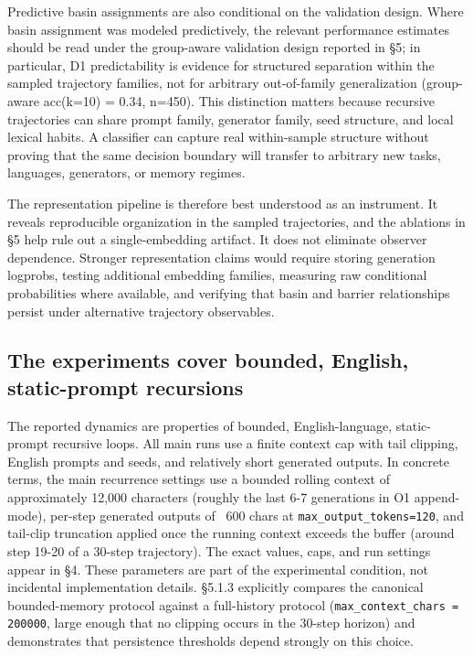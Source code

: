 \documentclass{article}
\theoremstyle{plain}
\theoremstyle{definition}
\begin{document}
Predictive basin assignments are also conditional on the validation design. Where basin assignment was modeled predictively, the relevant performance estimates should be read under the group-aware validation design reported in §5; in particular, D1 predictability is evidence for structured separation within the sampled trajectory families, not for arbitrary out-of-family generalization (group-aware acc(k=10) = 0.34, n=450). This distinction matters because recursive trajectories can share prompt family, generator family, seed structure, and local lexical habits. A classifier can capture real within-sample structure without proving that the same decision boundary will transfer to arbitrary new tasks, languages, generators, or memory regimes.

The representation pipeline is therefore best understood as an instrument. It reveals reproducible organization in the sampled trajectories, and the ablations in §5 help rule out a single-embedding artifact. It does not eliminate observer dependence. Stronger representation claims would require storing generation logprobs, testing additional embedding families, measuring raw conditional probabilities where available, and verifying that basin and barrier relationships persist under alternative trajectory observables.

\subsection{The experiments cover bounded, English, static-prompt recursions}

The reported dynamics are properties of bounded, English-language, static-prompt recursive loops. All main runs use a finite context cap with tail clipping, English prompts and seeds, and relatively short generated outputs. In concrete terms, the main recurrence settings use a bounded rolling context of approximately 12,000 characters (roughly the last 6-7 generations in O1 append-mode), per-step generated outputs of ~600 chars at \texttt{max\_output\_tokens=120}, and tail-clip truncation applied once the running context exceeds the buffer (around step 19-20 of a 30-step trajectory). The exact values, caps, and run settings appear in §4. These parameters are part of the experimental condition, not incidental implementation details. §5.1.3 explicitly compares the canonical bounded-memory protocol against a full-history protocol (\texttt{max\_context\_chars = 200000}, large enough that no clipping occurs in the 30-step horizon) and demonstrates that persistence thresholds depend strongly on this choice.
\end{document}
